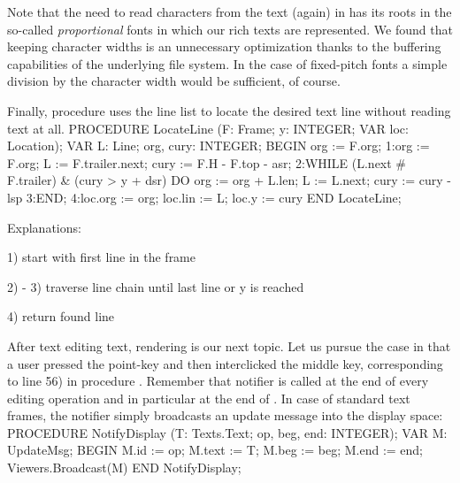 Note that the need to read characters from the text (again) in  has its roots in the so-called \emph{proportional} fonts in which our rich texts are represented. We found that keeping character widths is an unnecessary optimization thanks to the buffering capabilities of the underlying file system. In the case of fixed-pitch fonts a simple division by the character width would be sufficient, of course.

Finally, procedure  uses the line list to locate the desired text line without reading text at all.
\begintt
PROCEDURE LocateLine (F: Frame; y: INTEGER; VAR loc: Location);
VAR L: Line; org, cury: INTEGER;
BEGIN
  org := F.org;
1:org := F.org; L := F.trailer.next; cury := F.H - F.top - asr;
2:WHILE (L.next # F.trailer) & (cury > y + dsr) DO
  org := org + L.len; L := L.next; cury := cury - lsp
3:END;
4:loc.org := org; loc.lin := L; loc.y := cury
END LocateLine;
\endtt

Explanations:

1) start with first line in the frame

2) - 3) traverse line chain until last line or y is reached

4) return found line

\noindent After text editing text, rendering is our next topic. Let us pursue the case in that a user pressed the point-key and then interclicked the middle key, corresponding to line 56) in procedure . Remember that notifier is called at the end of every editing operation and in particular at the end of . In case of standard text frames, the notifier simply broadcasts an update message into the display space:
\begintt
PROCEDURE NotifyDisplay (T: Texts.Text; op, beg, end: INTEGER);
VAR M: UpdateMsg;
BEGIN
  M.id := op; M.text := T; M.beg := beg; M.end := end;
  Viewers.Broadcast(M)
END NotifyDisplay;
\endtt

